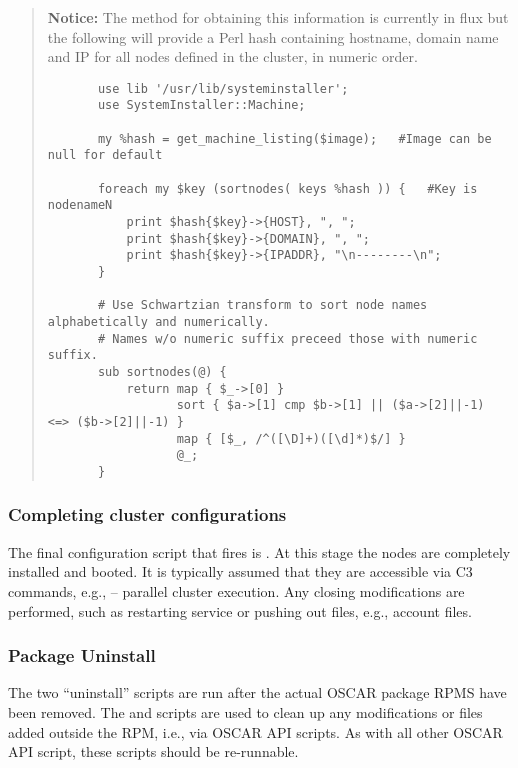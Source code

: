\begin{verse}
   {\bfseries Notice: } The method for obtaining this information is
   currently in flux but the following will provide a Perl hash containing
   hostname,  domain name and IP for all nodes defined in the cluster, in
   numeric order.
  \begin{footnotesize}
  \begin{verbatim}
       use lib '/usr/lib/systeminstaller';
       use SystemInstaller::Machine;

       my %hash = get_machine_listing($image);   #Image can be null for default

       foreach my $key (sortnodes( keys %hash )) {   #Key is nodenameN
           print $hash{$key}->{HOST}, ", ";
           print $hash{$key}->{DOMAIN}, ", ";
           print $hash{$key}->{IPADDR}, "\n--------\n";
       }

       # Use Schwartzian transform to sort node names alphabetically and numerically.
       # Names w/o numeric suffix preceed those with numeric suffix.
       sub sortnodes(@) {
	       return map { $_->[0] }
	              sort { $a->[1] cmp $b->[1] || ($a->[2]||-1) <=> ($b->[2]||-1) }
	              map { [$_, /^([\D]+)([\d]*)$/] }
	              @_;
       }
  \end{verbatim}
  \end{footnotesize}
\end{verse}



\subsubsection{Completing cluster configurations}

The final configuration script that fires is .  At this
stage the nodes are completely installed and booted.  It is typically
assumed that they are accessible via C3 commands, e.g.,  --
parallel cluster execution.  Any closing modifications are performed, such as
restarting service or pushing out files, e.g.,  account files.

\subsubsection{Package Uninstall}

The two ``uninstall'' scripts are run after the actual OSCAR package RPMS
have been removed.  The  and
 scripts are used to clean up any
modifications or files added outside the RPM, i.e., via OSCAR API scripts.
As with all other OSCAR API script, these scripts should be re-runnable.


